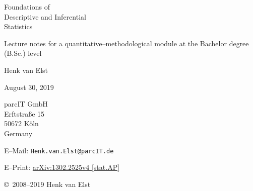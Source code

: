 \documentclass[a4paper,12pt,twoside]{book}
\begin{document}

\vspace*{1cm}
\begin{center}
{\Huge\sc
                    Foundations of \\
                    Descriptive and Inferential \\
                    Statistics
\par}
\par\vfill\vfill\vfill
              Lecture notes for a quantitative–methodological
							module at the Bachelor degree (B.Sc.) level
\par\vfill
\par\vfill
 
\par\vfill\vfill\vfill\vfill

                    {\large\sc Henk van Elst}

\par\vfill

                 August 30, 2019
\par\vfill\vfill

                 parcIT GmbH \\
								 Erftstra\ss e 15 \\
								 50672 K\"{o}ln \\
                 Germany
\par\vfill
                 E--Mail: \texttt{Henk.van.Elst@parcIT.de}
\par\vfill\vfill
                 E--Print: 
\href{http://arxiv.org/abs/1302.2525}{arXiv:1302.2525v4 [stat.AP]}
\par\vfill\vfill
								 \copyright\ 2008--2019 Henk van Elst 
\end{center}
\vspace*{1cm}
\sloppy
      \renewcommand{\thepage}{}                 %

      \newpage \thispagestyle{empty}
\tableofcontents
      \newpage \thispagestyle{empty}
      \cleardoublepage {}




















\end{document}
